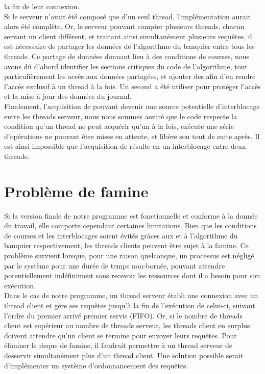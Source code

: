 \documentclass[11pt]{article}
\begin{document}
 la fin de leur connexion.
\\
Si le serveur n’avait été composé que d’un seul thread, l’implémentation aurait alors été complète. Or, le serveur pouvant compter plusieurs threads, chacun 
servant un client différent, et traitant ainsi simultanément plusieurs requêtes, il est nécessaire de partager les données de l’algorithme du banquier entre 
tous les threads. Ce partage de données donnant lieu à des conditions de courses, nous avons dû d’abord identifier les sections critiques du code de l’algorithme, 
tout particulièrement les accès aux données partagées, et ajouter des afin d’en rendre l’accès exclusif à un thread à la fois. Un second a été utiliser
 pour protéger l’accès et la mise à jour des données du journal. 
\\
Finalement, l’acquisition de pouvant devenir une source potentielle d’interblocage entre les threads serveur, nous nous sommes assuré que le code respecte
 la condition qu’un thread ne peut acquérir qu’un à la fois, exécute une série d’opérations ne pouvant être mises en attente, et libère son tout de 
 suite après. Il est ainsi impossible que l’acquisition de résulte en un interblocage entre deux threads.
\\
\section*{ Problème de famine }
\setlength{\parindent}{20pt}
Si la version finale de notre programme est fonctionnelle et conforme à la donnée du travail, elle comporte cependant certaines limitations. Bien que 
les conditions de courses et les interblocages soient évités grâces aux et à l’algorithme du banquier respectivement, les threads clients peuvent
 être sujet à la famine. Ce problème survient lorsque, pour une raison quelconque, un processus est négligé par le système pour une durée de temps non-bornée, 
 pouvant attendre potentiellement indéfiniment sans recevoir les ressources dont il a besoin pour son exécution. 
\\ 
Dans le cas de notre programme, un thread serveur établi une connexion avec un thread client et gère ses requêtes jusqu’à la fin de l’exécution de celui-ci,
 suivant l’ordre du premier arrivé premier servis (FIFO). Or, si le nombre de threads client est supérieur au nombre de threads serveur, les threads client
 en surplus doivent attendre qu’un client se termine pour envoyer leurs requêtes. Pour éliminer le risque de famine, il faudrait permettre à un thread serveur
 de desservir simultanément plus d’un thread client. Une solution possible serait d’implémenter un système d’ordonnancement des requêtes. 
\\ 
\end{document}
